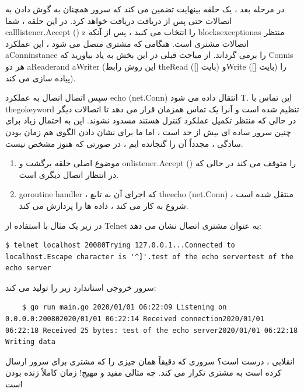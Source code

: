 \documentclass[12pt]{book}
\begin{document}
{در مرحله بعد ، یک حلقه بینهایت تضمین می کند که سرور همچنان به گوش دادن به اتصالات حتی پس از دریافت دریافت خواهد کرد. در این حلقه ، شما calllistener.Accept () z را انتخاب می کنید ، پس از آنکه blocksexceptionas منتظر اتصالات مشتری است. هنگامی که مشتری متصل می شود ، این عملکرد aConninstance را برمی گرداند. از مباحث قبلی در این بخش به یاد بیاورید که Connis هر دو aReaderand aWriter (این روش رابط theRead ([] بایت) وWrite ([] بایت) را پیاده سازی می کند).

سپس اتصال اتصال به عملکرد echo (net.Conn) انتقال داده می شود T. این تماس با thegokeyword تنظیم شده است و آنرا یک تماس همزمان قرار می دهد تا اتصالات دیگر در حالی که منتظر تکمیل عملکرد کنترل هستند مسدود نشوند. این به احتمال زیاد برای چنین سرور ساده ای بیش از حد است ، اما ما برای نشان دادن الگوی هم زمان بودن سادگی ، مجدداً آن را گنجانده ایم ، در صورتی که هنوز مشخص نیست.
\begin{enumerate}
	\item موضوع اصلی حلقه برگشت و onlistener.Accept () را متوقف می کند در حالی که در انتظار اتصال دیگری است.
	\item goroutine handler ، که اجرای آن به تابع theecho (net.Conn) منتقل شده است ، شروع به کار می کند ، داده ها را پردازش می کند.
\end{enumerate}

در زیر یک مثال با استفاده از Telnet به عنوان مشتری اتصال نشان می دهد:
\begin{latin}
	\begin{lstlisting}$ telnet localhost 20080Trying 127.0.0.1...Connected to localhost.Escape character is '^]'.test of the echo servertest of the echo server
	\end{lstlisting}
\end{latin}

سرور خروجی استاندارد زیر را تولید می کند:
\begin{latin}
	\begin{lstlisting}
	$ go run main.go 2020/01/01 06:22:09 Listening on 0.0.0.0:200802020/01/01 06:22:14 Received connection2020/01/01 06:22:18 Received 25 bytes: test of the echo server2020/01/01 06:22:18 Writing data
	\end{lstlisting}
\end{latin}

انقلابی ، درست است؟ سروری که دقیقاً همان چیزی را که مشتری برای سرور ارسال کرده است به مشتری تکرار می کند. چه مثالی مفید و مهیج! زمان کاملاً زنده بودن است

}
\end{document}
